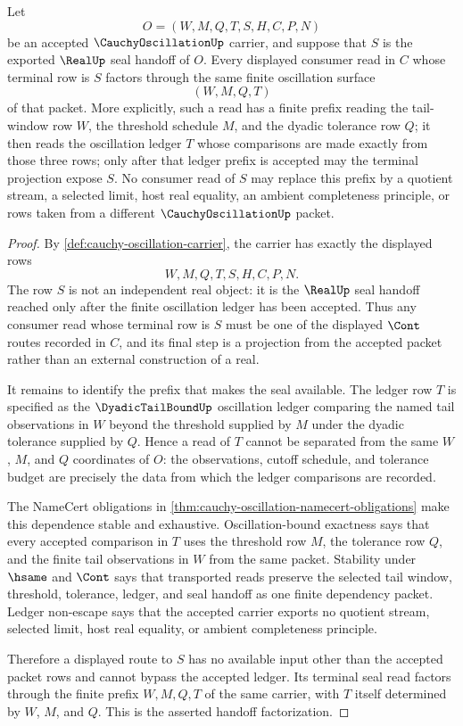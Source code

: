 \begin{theorem}
\label{thm:cauchy-oscillation-seal-handoff-factorization}
Let
$$
O=(W,M,Q,T,S,H,C,P,N)
$$
be an accepted $\CauchyOscillationUp$ carrier, and suppose that $S$ is the exported $\RealUp$ seal handoff of $O$. Every displayed consumer read in $C$ whose terminal row is $S$ factors through the same finite oscillation surface
$$
(W,M,Q,T)
$$
of that packet. More explicitly, such a read has a finite prefix reading the tail-window row $W$, the threshold schedule $M$, and the dyadic tolerance row $Q$; it then reads the oscillation ledger $T$ whose comparisons are made exactly from those three rows; only after that ledger prefix is accepted may the terminal projection expose $S$. No consumer read of $S$ may replace this prefix by a quotient stream, a selected limit, host real equality, an ambient completeness principle, or rows taken from a different $\CauchyOscillationUp$ packet.
\end{theorem}
\begin{proof}
By \autoref{def:cauchy-oscillation-carrier}, the carrier has exactly the displayed rows
$$
W,M,Q,T,S,H,C,P,N.
$$
The row $S$ is not an independent real object: it is the $\RealUp$ seal handoff reached only after the finite oscillation ledger has been accepted. Thus any consumer read whose terminal row is $S$ must be one of the displayed $\Cont$ routes recorded in $C$, and its final step is a projection from the accepted packet rather than an external construction of a real.

It remains to identify the prefix that makes the seal available. The ledger row $T$ is specified as the $\DyadicTailBoundUp$ oscillation ledger comparing the named tail observations in $W$ beyond the threshold supplied by $M$ under the dyadic tolerance supplied by $Q$. Hence a read of $T$ cannot be separated from the same $W$, $M$, and $Q$ coordinates of $O$: the observations, cutoff schedule, and tolerance budget are precisely the data from which the ledger comparisons are recorded.

The NameCert obligations in \autoref{thm:cauchy-oscillation-namecert-obligations} make this dependence stable and exhaustive. Oscillation-bound exactness says that every accepted comparison in $T$ uses the threshold row $M$, the tolerance row $Q$, and the finite tail observations in $W$ from the same packet. Stability under $\hsame$ and $\Cont$ says that transported reads preserve the selected tail window, threshold, tolerance, ledger, and seal handoff as one finite dependency packet. Ledger non-escape says that the accepted carrier exports no quotient stream, selected limit, host real equality, or ambient completeness principle.

Therefore a displayed route to $S$ has no available input other than the accepted packet rows and cannot bypass the accepted ledger. Its terminal seal read factors through the finite prefix $W,M,Q,T$ of the same carrier, with $T$ itself determined by $W$, $M$, and $Q$. This is the asserted handoff factorization.
\end{proof}

